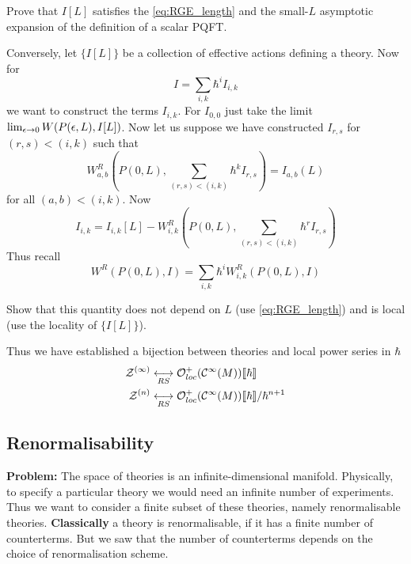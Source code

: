 \begin{ex}
  Prove that $I[L]$ satisfies the \eqref{eq:RGE_length} and the small-$L$ asymptotic expansion of the definition of a scalar PQFT.
\end{ex}

Conversely, let $\{I[L]\}$ be a collection of effective actions defining a theory. Now for
\begin{equation} I = \sum_{i,k} \hbar^i I_{i,k}\end{equation}
we want to construct the terms $I_{i,k}$. For $I_{0,0}$ just take the limit $\lim_{\epsilon \ra 0} W(P(\epsilon,L), I[L])$. Now let us suppose we have constructed $I_{r,s}$ for $(r,s)<(i,k)$ such that
\begin{equation} W^R_{a,b}\left(P(0,L), \sum_{(r,s)<(i,k)} \hbar^k I_{r,s}\right) = I_{a,b}(L)\end{equation}
for all $(a,b) < (i,k)$. Now
\begin{equation}I_{i,k} = I_{i,k}[L] - W^R_{i,k}\left(P(0,L), \sum_{(r,s)<(i,k)} \hbar^r I_{r,s} \right)\end{equation}
Thus recall
\begin{equation} W^R(P(0,L), I) = \sum_{i,k} \hbar^i W_{i,k}^R (P(0,L), I)\end{equation}

\begin{ex}
  Show that this quantity does not depend on $L$ (use \eqref{eq:RGE_length}) and is local (use the locality of $\{I[L]\}$).
\end{ex}

Thus we have established a bijection between theories and local power series in $\hbar$
\begin{align}
  \mathcal{Z}^{(\infty)} &\underset{RS}{\longleftrightarrow} \mathcal{O}^+_{loc}(\mathcal{C}^{\infty}(M))\llbracket \hbar \rrbracket \\
  \mathcal{Z}^{(n)} &\underset{RS}{\longleftrightarrow} \mathcal{O}^+_{loc}(\mathcal{C}^{\infty}(M))\llbracket \hbar \rrbracket / \hbar^{n+1}
\end{align}


\subsection{Renormalisability}

\textbf{Problem:} The space of theories is an infinite-dimensional manifold. Physically, to specify a particular theory we would need an infinite number of experiments.\\

Thus we want to consider a finite subset of these theories, namely renormalisable theories. \textbf{Classically} a theory is renormalisable, if it has a finite number of counterterms. But we saw that the number of counterterms depends on the choice of renormalisation scheme.

